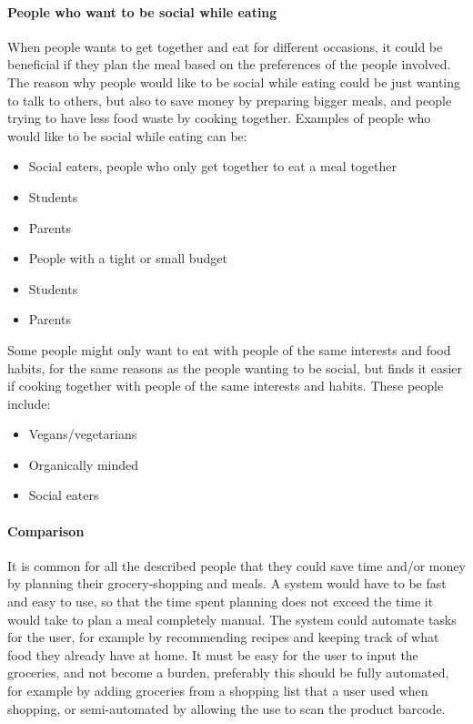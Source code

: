\paragraph{People who want to be social while eating}
When people wants to get together and eat for different occasions, it could be beneficial if they plan the meal based on the preferences of the people involved. The reason why people would like to be social while eating could be just wanting to talk to others, but also to save money by preparing bigger meals, and people trying to have less food waste by cooking together. Examples of people who would like to be social while eating can be:
\begin{itemize}
\item Social eaters, people who only get together to eat a meal together
\item Students
\item Parents
\item People with a tight or small budget
\item Students
\item Parents
\end{itemize}

Some people might only want to eat with people of the same interests and food habits, for the same reasons as the people wanting to be social, but finds it easier if cooking together with people of the same interests and habits. These people include:

\begin{itemize}
\item Vegans/vegetarians
\item Organically minded
\item Social eaters
\end{itemize}

\paragraph{Comparison}
It is common for all the described people that they could save time and/or money by planning their grocery-shopping and meals. A system would have to be fast and easy to use, so that the time spent planning does not exceed the time it would take to plan a meal completely manual. The system could automate tasks for the user, for example by recommending recipes and keeping track of what food they already have at home. It must be easy for the user to input the groceries, and not become a burden, preferably this should be fully automated, for example by adding groceries from a shopping list that a user used when shopping, or semi-automated by allowing the use to scan the product barcode.